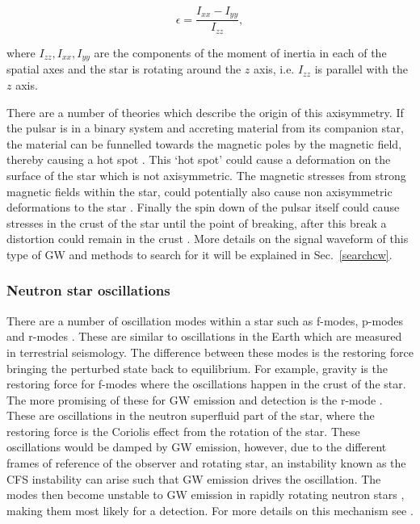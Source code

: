 \begin{equation}
\label{intro:source:cw:ellipticity}
\epsilon = \frac{I_{xx}-I_{yy}}{I_{zz}},
\end{equation}

where $I_{zz},I_{xx},I_{yy}$ are the components of the moment of inertia in each of the spatial axes and the star is rotating around the $z$ axis, i.e. $I_{zz}$ is parallel with the $z$ axis.

There are a number of theories which describe the origin of this axisymmetry.
If the pulsar is in a binary system and accreting material from its companion
star, the material can be funnelled towards the magnetic poles by the magnetic
field, thereby causing a hot spot \citep{haskell2015DetectingGravitational}.
This `hot spot' could cause a deformation on the surface of the star which is
not axisymmetric.  The magnetic stresses from strong magnetic fields within the
star, could potentially also cause non axisymmetric deformations to the star
\citep{cutler2002GravitationalWaves}. Finally
the spin down of the pulsar itself could cause stresses in the crust of the
star until the point of breaking, after this break a
distortion could remain in the crust \citep{becker2009NeutronStars} .  
More details on the signal waveform of this type of \gls{GW} and methods to search for it will be explained in Sec.~\ref{searchcw}.
 
\subsubsection{Neutron star oscillations}
There are a number of oscillation modes within a star such as f-modes, p-modes
and r-modes \citep{becker2009NeutronStars}.  These are similar to oscillations
in the Earth which are measured in terrestrial seismology.  The difference
between these modes is the restoring force bringing the perturbed state back to
equilibrium.  For example, gravity is the restoring force for f-modes where the
oscillations happen in the crust of the star.  The more promising of these for
\gls{GW} emission and detection is the r-mode
\citep{owen2000GravitationalWaves}.
These are oscillations in the neutron superfluid part of the star, where the
restoring force is the Coriolis effect from the rotation of the star.  
These oscillations would be damped by \gls{GW} emission, however, due to the different frames of reference of the observer and rotating star, an instability known as the \gls{CFS} instability \citep{chandrasekhar1970SolutionsTwo} can arise such that \gls{GW} emission drives the oscillation. 
The modes then become unstable to \gls{GW} emission in rapidly rotating neutron
stars \citep{owen2000GravitationalWaves}, making them most likely for a
detection.  For more details on this mechanism see
\citep{owen2000GravitationalWaves,lasky2015GravitationalWaves,owen1998GravitationalWaves,jonesCFSInstability}.


